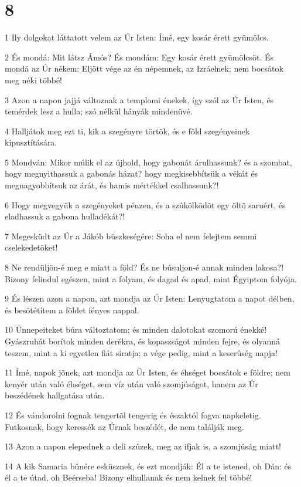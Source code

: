 \chapter{8}

\par 1 Ily dolgokat láttatott velem az Úr Isten: Ímé, egy kosár érett gyümölcs.
\par 2 És mondá: Mit látsz Ámós? És mondám: Egy kosár érett gyümölcsöt. És mondá az Úr nékem: Eljött vége az én népemnek, az Izráelnek; nem bocsátok meg néki többé!
\par 3 Azon a napon jajjá változnak a templomi énekek, így szól az Úr Isten, és temérdek lesz a hulla; szó nélkül hányák mindenüvé.
\par 4 Halljátok meg ezt ti, kik a szegényre törtök, és e föld szegényeinek kipusztítására.
\par 5 Mondván: Mikor múlik el az újhold, hogy gabonát árulhassunk? és a szombat, hogy megnyithassuk a gabonás házat? hogy megkisebbítsük a vékát és megnagyobbítsuk az árát, és hamis mértékkel csalhassunk?!
\par 6 Hogy megvegyük a szegényeket pénzen, és a szûkölködõt egy öltõ saruért, és eladhassuk a gabona hulladékát?!
\par 7 Megesküdt az Úr a Jákób büszkeségére: Soha el nem felejtem semmi cselekedetöket!
\par 8 Ne rendüljön-é meg e miatt a föld? És ne búsuljon-é annak minden lakosa?! Bizony felindul egészen, mint a folyam, és dagad és apad, mint Égyiptom folyója.
\par 9 És lészen azon a napon, azt mondja az Úr Isten: Lenyugtatom a napot délben, és besötétítem a földet fényes nappal.
\par 10 Ünnepeiteket búra változtatom; és minden dalotokat szomorú énekké! Gyászruhát borítok minden derékra, és kopaszságot minden fejre, és olyanná teszem, mint a ki egyetlen fiát  siratja; a vége pedig, mint a keserûség napja!
\par 11 Ímé, napok jõnek, azt mondja az Úr Isten, és éhséget bocsátok e földre; nem kenyér után való éhséget, sem víz után való szomjúságot, hanem az Úr beszédének hallgatása után.
\par 12 És vándorolni fognak tengertõl tengerig és északtól fogva napkeletig. Futkosnak, hogy keressék az Úrnak beszédét, de nem találják meg.
\par 13 Azon a napon elepednek a deli szûzek, meg az ifjak is, a szomjúság miatt!
\par 14 A kik Samaria bûnére esküsznek, és ezt mondják: Él a te istened, oh Dán: és él a te útad, oh Beérseba! Bizony elhullanak  és nem kelnek fel többé!

